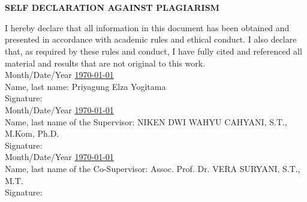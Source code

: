 \chapter*{}
\vspace*{-1.0cm}
\begin{center}
\normalfont\LARGE\textbf{SELF DECLARATION AGAINST PLAGIARISM}
\end{center}
I hereby declare that all information in this document has been obtained and presented in accordance with academic rules and ethical conduct. I also declare that, as required by these rules and conduct, I have fully cited and referenced all material and results that are not original to this work.\\[0.3cm]
\noindent
Month/Date/Year \underline{\mydate \today}\\
Name, last name: Priyagung Elza Yogitama
\\[2.5cm]
Signature: \underline{\hspace*{5cm}}\\[0.4cm]
Month/Date/Year \underline{\mydate \today}\\
Name, last name of the Supervisor: NIKEN DWI WAHYU CAHYANI, S.T., M.Kom, Ph.D.
\\[2.5cm]
Signature: \underline{\hspace*{5cm}}\\[0.4cm]
Month/Date/Year \underline{\mydate \today}\\
Name, last name of the Co-Supervisor:  Assoc. Prof. Dr. VERA SURYANI, S.T., M.T.
\\[2.5cm]
Signature: \underline{\hspace*{5cm}}